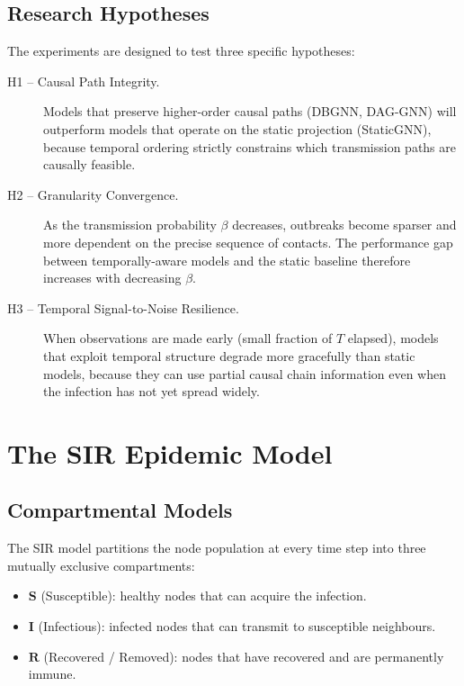 \documentclass[12pt,a4paper]{report}
\begin{document}
\section{Research Hypotheses}

The experiments are designed to test three specific hypotheses:

\begin{description}
  \item[H1 -- Causal Path Integrity.] Models that preserve higher-order causal
    paths (DBGNN, DAG-GNN) will outperform models that operate on the static
    projection (StaticGNN), because temporal ordering strictly constrains which
    transmission paths are causally feasible.
  \item[H2 -- Granularity Convergence.] As the transmission probability $\beta$
    decreases, outbreaks become sparser and more dependent on the precise sequence
    of contacts. The performance gap between temporally-aware models and the
    static baseline therefore increases with decreasing $\beta$.
  \item[H3 -- Temporal Signal-to-Noise Resilience.] When observations are made
    early (small fraction of $T$ elapsed), models that exploit temporal structure
    degrade more gracefully than static models, because they can use partial
    causal chain information even when the infection has not yet spread widely.
\end{description}

\chapter{The SIR Epidemic Model}
\label{chap:sir}

\section{Compartmental Models}

The SIR model partitions the node population at every time step into three
mutually exclusive compartments:

\begin{itemize}[noitemsep]
  \item $\mathbf{S}$ (Susceptible): healthy nodes that can acquire the infection.
  \item $\mathbf{I}$ (Infectious): infected nodes that can transmit to susceptible
    neighbours.
  \item $\mathbf{R}$ (Recovered / Removed): nodes that have recovered and are
    permanently immune.
\end{itemize}
\end{document}
